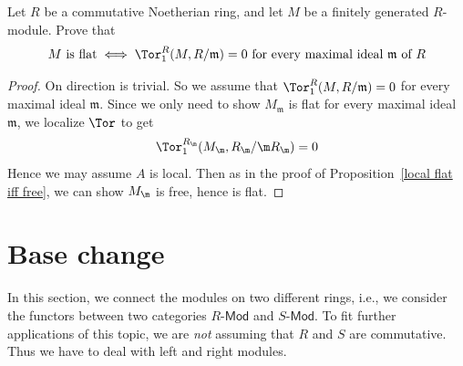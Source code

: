 \begin{exercise}
Let $R$ be a commutative Noetherian ring, and let $M$ be a finitely generated $R$-module. Prove that
\[M\text{ is flat}\iff \Tor^R_1(M,R/\mathfrak{m})=0\text{ for every maximal ideal $\mathfrak{m}$ of $R$}\]
\end{exercise}
\begin{proof}
On direction is trivial. So we assume that $\Tor^R_1(M,R/\mathfrak{m})=0$ for every maximal ideal $\mathfrak{m}$. Since we only need to show $M_{\mathfrak{m}}$ is flat for every maximal ideal $\mathfrak{m}$, we localize $\Tor$ to get
\[\Tor^{R_\m}_1(M_\m,R_\m/\m R_\m)=0\]
Hence we may assume $A$ is local. Then as in the proof of Proposition~\ref{local flat iff free}, we can show $M_\m$ is free, hence is flat.
\end{proof}
\section{Base change}
In this section, we connect the modules on two different rings, i.e., we consider the functors between two categories $R$-$\mathsf{Mod}$ and $S$-$\mathsf{Mod}$. To fit further applications of this topic, we are \textit{not} assuming that $R$ and $S$ are commutative. Thus we have to deal with left and right modules.

